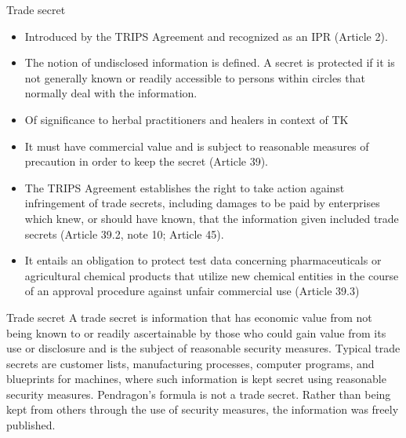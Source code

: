 \documentclass[
  ignorenonframetext,
  aspectratio=169]{beamer}
\providecommand{\tightlist}{%
  \setlength{\itemsep}{0pt}\setlength{\parskip}{0pt}}
\begin{document}
\begin{frame}{Trade secret}
\protect\hypertarget{trade-secret}{}
\begin{itemize}
\tightlist
\item
  Introduced by the TRIPS Agreement and recognized as an IPR (Article
  2).
\item
  The notion of undisclosed information is defined. A secret is
  protected if it is not generally known or readily accessible to
  persons within circles that normally deal with the information.
\item
  Of significance to herbal practitioners and healers in context of TK
\item
  It must have commercial value and is subject to reasonable measures of
  precaution in order to keep the secret (Article 39).
\item
  The TRIPS Agreement establishes the right to take action against
  infringement of trade secrets, including damages to be paid by
  enterprises which knew, or should have known, that the information
  given included trade secrets (Article 39.2, note 10; Article 45).
\item
  It entails an obligation to protect test data concerning
  pharmaceuticals or agricultural chemical products that utilize new
  chemical entities in the course of an approval procedure against
  unfair commercial use (Article 39.3)
\end{itemize}
\end{frame}

\begin{frame}{Trade secret}
\protect\hypertarget{trade-secret-1}{}
A trade secret is information that has economic value from not being
known to or readily ascertainable by those who could gain value from its
use or disclosure and is the subject of reasonable security measures.
Typical trade secrets are customer lists, manufacturing processes,
computer programs, and blueprints for machines, where such information
is kept secret using reasonable security measures. Pendragon's formula
is not a trade secret. Rather than being kept from others through the
use of security measures, the information was freely published.
\end{frame}
\end{document}
